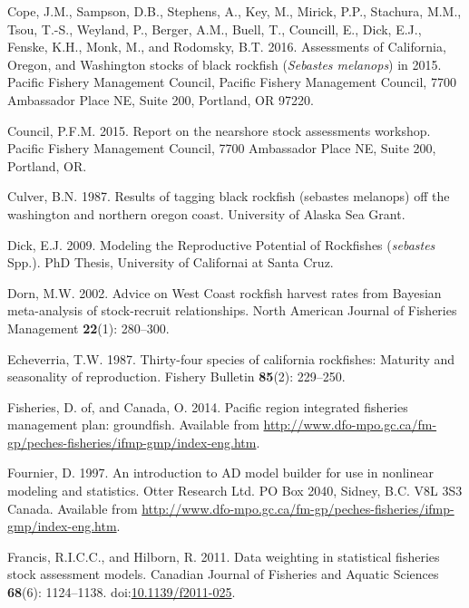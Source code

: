 \documentclass[11pt,
  letterpaper,
]{article}
\newlength{\cslhangindent}
\newenvironment{CSLReferences}[2] %
 {%
  \setlength{\parindent}{0pt}
  \ifodd #1 \everypar{\setlength{\hangindent}{\cslhangindent}}\ignorespaces\fi
  \ifnum #2 > 0
  \setlength{\parskip}{#2\baselineskip}
  \fi
 }%
 {}
\begin{document}
\begin{CSLReferences}{1}{0}
\leavevmode{}%
Cope, J.M., Sampson, D.B., Stephens, A., Key, M., Mirick, P.P., Stachura, M.M., Tsou, T.-S., Weyland, P., Berger, A.M., Buell, T., Councill, E., Dick, E.J., Fenske, K.H., Monk, M., and Rodomsky, B.T. 2016. Assessments of {California}, {Oregon}, and {Washington} stocks of black rockfish (\emph{{Sebastes} melanops}) in 2015. Pacific Fishery Management Council, Pacific Fishery Management Council, 7700 Ambassador Place NE, Suite 200, Portland, OR 97220.

\leavevmode{}%
Council, P.F.M. 2015. Report on the nearshore stock assessments workshop. Pacific Fishery Management Council, 7700 Ambassador Place NE, Suite 200, Portland, OR.

\leavevmode{}%
Culver, B.N. 1987. Results of tagging black rockfish (sebastes melanops) off the washington and northern oregon coast. University of Alaska Sea Grant.

\leavevmode{}%
Dick, E.J. 2009. Modeling the {Reproductive} {Potential} of {Rockfishes} (\emph{sebastes} {Spp}.). PhD Thesis, University of Californai at Santa Cruz.

\leavevmode{}%
Dorn, M.W. 2002. Advice on {West} {Coast} rockfish harvest rates from {B}ayesian meta-analysis of stock-recruit relationships. North American Journal of Fisheries Management \textbf{22}(1): 280--300.

\leavevmode{}%
Echeverria, T.W. 1987. Thirty-four species of california rockfishes: Maturity and seasonality of reproduction. Fishery Bulletin \textbf{85}(2): 229--250.

\leavevmode{}%
Fisheries, D. of, and Canada, O. 2014. Pacific region integrated fisheries management plan: groundfish. Available from \url{http://www.dfo-mpo.gc.ca/fm-gp/peches-fisheries/ifmp-gmp/index-eng.htm}.

\leavevmode{}%
Fournier, D. 1997. An introduction to AD model builder for use in nonlinear modeling and statistics. Otter Research Ltd. PO Box 2040, Sidney, B.C. V8L 3S3 Canada. Available from \url{http://www.dfo-mpo.gc.ca/fm-gp/peches-fisheries/ifmp-gmp/index-eng.htm}.

\leavevmode{}%
Francis, R.I.C.C., and Hilborn, R. 2011. Data weighting in statistical fisheries stock assessment models. Canadian Journal of Fisheries and Aquatic Sciences \textbf{68}(6): 1124--1138. doi:\href{https://doi.org/10.1139/f2011-025}{10.1139/f2011-025}.


\end{CSLReferences}
\end{document}
